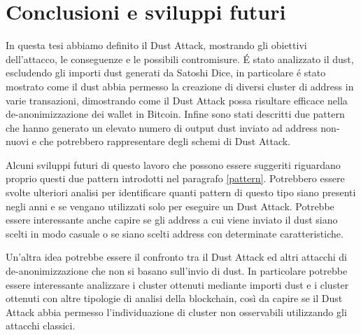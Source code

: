 \chapter{Conclusioni e sviluppi futuri}
In questa tesi abbiamo definito il Dust Attack, mostrando gli obiettivi dell'attacco, le conseguenze e le possibili contromisure. É stato analizzato il dust, escludendo gli importi dust generati da Satoshi Dice, in particolare é stato mostrato come il dust abbia permesso la creazione di diversi cluster di address in varie transazioni, dimostrando come il Dust Attack possa risultare efficace nella de-anonimizzazione dei wallet in Bitcoin. Infine sono stati descritti due pattern che hanno generato un elevato numero di output dust inviato ad address non-nuovi e che potrebbero rappresentare degli schemi di Dust Attack. 

Alcuni sviluppi futuri di questo lavoro che possono essere suggeriti riguardano proprio questi due pattern introdotti nel paragrafo \ref{pattern}. Potrebbero essere svolte ulteriori analisi per identificare quanti pattern di questo tipo siano presenti negli anni e se vengano utilizzati solo per eseguire un Dust Attack. Potrebbe essere interessante anche capire se gli address a cui viene inviato il dust siano scelti in modo casuale o se siano scelti address con determinate caratteristiche. 

Un'altra idea potrebbe essere il confronto tra il Dust Attack ed altri attacchi di de-anonimizzazione che non si basano sull'invio di dust. In particolare potrebbe essere interessante analizzare i cluster ottenuti mediante importi dust e i cluster ottenuti con altre tipologie di analisi della blockchain, così da capire se il Dust Attack abbia permesso l'individuazione di cluster non osservabili utilizzando gli attacchi classici.